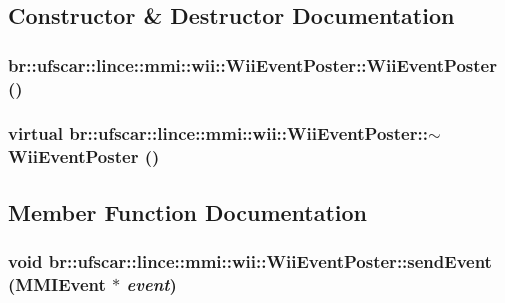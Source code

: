 \subsection{Constructor \& Destructor Documentation}
\hypertarget{classbr_1_1ufscar_1_1lince_1_1mmi_1_1wii_1_1WiiEventPoster_a36425c0fcb515ff86f97cb68b2bd70e7}{
\subsubsection[{WiiEventPoster}]{\setlength{\rightskip}{0pt plus 5cm}br::ufscar::lince::mmi::wii::WiiEventPoster::WiiEventPoster ()}}
\label{classbr_1_1ufscar_1_1lince_1_1mmi_1_1wii_1_1WiiEventPoster_a36425c0fcb515ff86f97cb68b2bd70e7}
\hypertarget{classbr_1_1ufscar_1_1lince_1_1mmi_1_1wii_1_1WiiEventPoster_aef8a15c7fc7e8d3b02673cd08e799fd1}{
\subsubsection[{$\sim$WiiEventPoster}]{\setlength{\rightskip}{0pt plus 5cm}virtual br::ufscar::lince::mmi::wii::WiiEventPoster::$\sim$WiiEventPoster ()}}
\label{classbr_1_1ufscar_1_1lince_1_1mmi_1_1wii_1_1WiiEventPoster_aef8a15c7fc7e8d3b02673cd08e799fd1}


\subsection{Member Function Documentation}
\hypertarget{classbr_1_1ufscar_1_1lince_1_1mmi_1_1wii_1_1WiiEventPoster_a5e1eb67b8afb4324be1899a043ee92c4}{
\subsubsection[{sendEvent}]{\setlength{\rightskip}{0pt plus 5cm}void br::ufscar::lince::mmi::wii::WiiEventPoster::sendEvent ({\bf MMIEvent} $\ast$ {\em event})}}
\label{classbr_1_1ufscar_1_1lince_1_1mmi_1_1wii_1_1WiiEventPoster_a5e1eb67b8afb4324be1899a043ee92c4}


